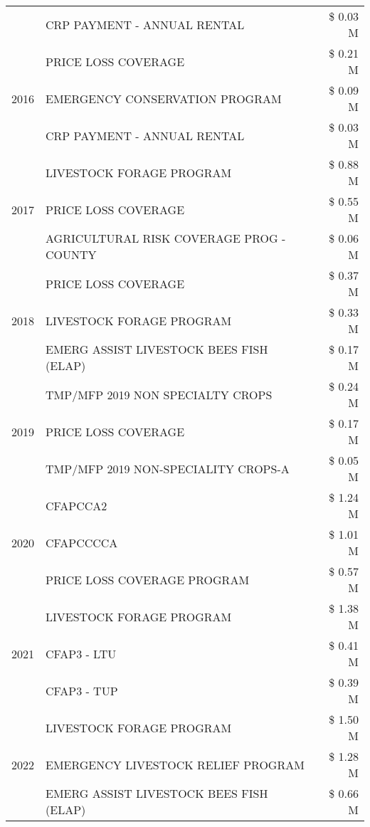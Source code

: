\begin{tabular}{llr}
 & CRP PAYMENT - ANNUAL RENTAL & \$ 0.03 M \\
\cline{1-3}
\multirow[t]{3}{*}{2016} & PRICE LOSS COVERAGE & \$ 0.21 M \\
 & EMERGENCY CONSERVATION PROGRAM & \$ 0.09 M \\
 & CRP PAYMENT - ANNUAL RENTAL & \$ 0.03 M \\
\cline{1-3}
\multirow[t]{3}{*}{2017} & LIVESTOCK FORAGE PROGRAM & \$ 0.88 M \\
 & PRICE LOSS COVERAGE & \$ 0.55 M \\
 & AGRICULTURAL RISK COVERAGE PROG - COUNTY & \$ 0.06 M \\
\cline{1-3}
\multirow[t]{3}{*}{2018} & PRICE LOSS COVERAGE & \$ 0.37 M \\
 & LIVESTOCK FORAGE PROGRAM & \$ 0.33 M \\
 & EMERG ASSIST LIVESTOCK BEES FISH (ELAP) & \$ 0.17 M \\
\cline{1-3}
\multirow[t]{3}{*}{2019} & TMP/MFP 2019 NON SPECIALTY CROPS & \$ 0.24 M \\
 & PRICE LOSS COVERAGE & \$ 0.17 M \\
 & TMP/MFP 2019 NON-SPECIALITY CROPS-A & \$ 0.05 M \\
\cline{1-3}
\multirow[t]{3}{*}{2020} & CFAPCCA2 & \$ 1.24 M \\
 & CFAPCCCCA & \$ 1.01 M \\
 & PRICE LOSS COVERAGE PROGRAM & \$ 0.57 M \\
\cline{1-3}
\multirow[t]{3}{*}{2021} & LIVESTOCK FORAGE PROGRAM & \$ 1.38 M \\
 & CFAP3 - LTU & \$ 0.41 M \\
 & CFAP3 - TUP & \$ 0.39 M \\
\cline{1-3}
\multirow[t]{3}{*}{2022} & LIVESTOCK FORAGE PROGRAM & \$ 1.50 M \\
 & EMERGENCY LIVESTOCK RELIEF PROGRAM & \$ 1.28 M \\
 & EMERG ASSIST LIVESTOCK BEES FISH (ELAP) & \$ 0.66 M \\
\cline{1-3}
\bottomrule
\end{tabular}
